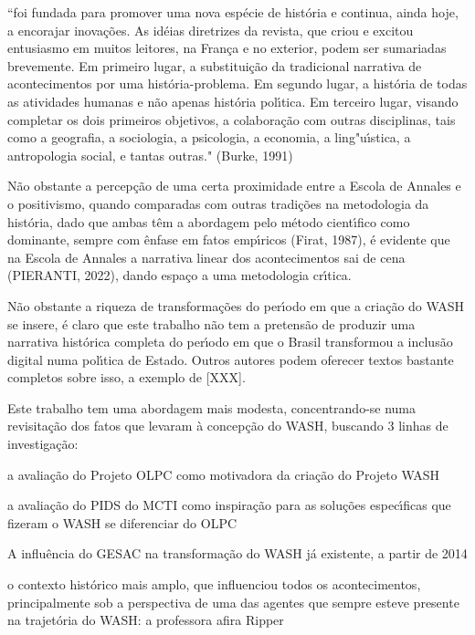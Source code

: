 \documentclass[
12pt,		%
openright,	%
twoside,  %
a4paper,			%
chapter=TITLE,		%
english,			%
french,				%
spanish,			%
brazil				%
]{USPSC-classe/USPSC}
\begin{document}
“foi fundada para promover uma nova esp\'ecie de hist\'oria e continua, ainda hoje, a encorajar inova\c{c}\~oes. As id\'eias diretrizes da revista, que criou e excitou entusiasmo em muitos leitores, na  Fran\c{c}a e no exterior, podem ser sumariadas brevemente. Em primeiro lugar, a substitui\c{c}\~ao da tradicional narrativa de acontecimentos por uma hist\'oria-problema. Em segundo lugar, a hist\'oria de todas as atividades humanas e n\~ao apenas hist\'oria pol\'{\i}tica. Em terceiro lugar, visando completar os dois primeiros objetivos, a colabora\c{c}\~ao com outras disciplinas, tais como a geografia, a sociologia, a psicologia, a economia, a ling"u\'{\i}stica, a antropologia social, e tantas outras."  (Burke, 1991)

N\~ao obstante a percep\c{c}\~ao de uma certa proximidade entre a Escola de Annales e o positivismo, quando comparadas com outras tradi\c{c}\~oes na metodologia da hist\'oria, dado que ambas t\^em a abordagem pelo m\'etodo cient\'{\i}fico como dominante, sempre com \^enfase em fatos emp\'{\i}ricos (Firat, 1987), \'e evidente que na Escola de Annales a narrativa linear dos acontecimentos sai de cena (PIERANTI, 2022), dando espa\c{c}o a uma metodologia cr\'{\i}tica.


N\~ao obstante a riqueza de transforma\c{c}\~oes do per\'{\i}odo em que a cria\c{c}\~ao do WASH se insere, \'e claro que este trabalho n\~ao tem a pretens\~ao de produzir uma narrativa hist\'orica completa do per\'{\i}odo em que o Brasil transformou a inclus\~ao digital numa pol\'{\i}tica de Estado. Outros autores podem oferecer textos bastante completos sobre isso, a exemplo de [XXX].


Este trabalho tem uma abordagem mais modesta, concentrando-se numa revisita\c{c}\~ao dos fatos que levaram \`a concep\c{c}\~ao do WASH, buscando 3 linhas de investiga\c{c}\~ao:






\begin{alineas}
\item a avalia\c{c}\~ao do Projeto OLPC como motivadora da cria\c{c}\~ao do Projeto WASH
\item a avalia\c{c}\~ao do PIDS do MCTI como inspira\c{c}\~ao para as solu\c{c}\~oes espec\'{\i}ficas que fizeram o WASH se diferenciar do OLPC
\item A influ\^encia do GESAC na transforma\c{c}\~ao do WASH j\'a existente, a partir de 2014
\item o contexto hist\'orico mais amplo, que influenciou todos os acontecimentos, principalmente sob a perspectiva de uma das agentes que sempre esteve presente na trajet\'oria do WASH: a professora afira Ripper
\end{alineas}
\end{document}
